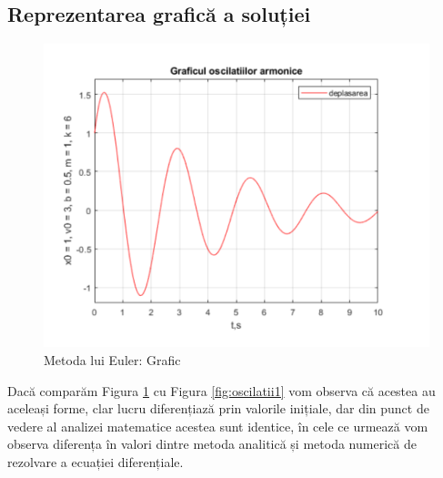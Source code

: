\documentclass[12pt, a4paper]{article}
\begin{document}
\subsection{Reprezentarea grafică a soluției}
\begin{figure}[h]
    \centering
    \includegraphics[width=\linewidth, height=\textheight, keepaspectratio]{graph}
    \caption{Metoda lui Euler: Grafic}
    \label{fig:euler_graph}
\end{figure}
\vspace{1cm}
Dacă comparăm Figura \ref{fig:euler_graph} cu Figura \ref{fig:oscilatii1} vom observa că acestea au aceleași forme, clar lucru diferențiază prin valorile inițiale, dar din punct de vedere al analizei matematice acestea sunt identice, în cele ce urmează vom observa diferența în valori dintre metoda analitică și metoda numerică de rezolvare a ecuației diferențiale.
\newpage
\end{document}
